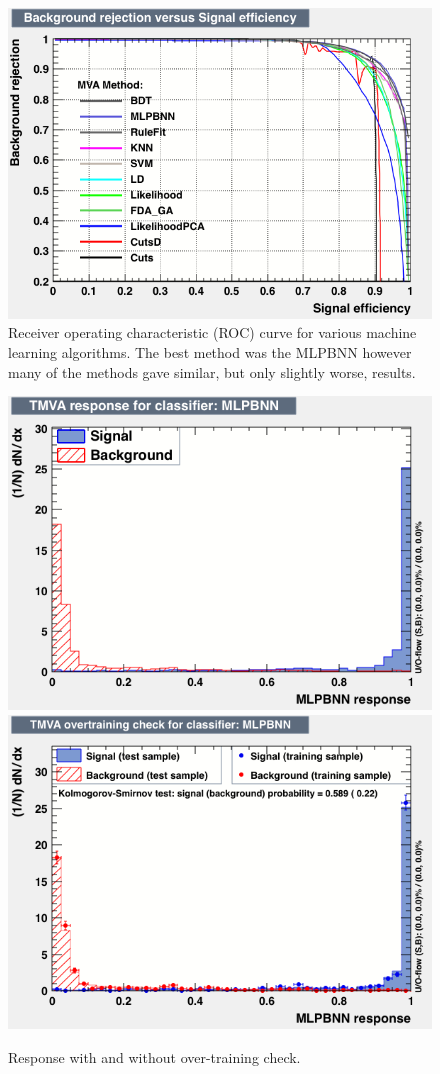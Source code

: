 \begin{figure}[h!]
\centering
\includegraphics[width=\textwidth]{figures/newTMVAplots/rejBvsS.png}
\caption{Receiver operating characteristic (ROC) curve for various machine learning algorithms. The best method was the MLPBNN however many of the methods gave similar, but only slightly worse, results.}
\label{fig:TMVANeuroc}
\end{figure}

\begin{figure}[h!]
\centering
\includegraphics[width=.49\textwidth]{figures/newTMVAplots/mva_MLPBNN.png}
\includegraphics[width=.49\textwidth]{figures/newTMVAplots/overtrain_MLPBNN.png}
\caption{Response with and without over-training check.}
\label{fig:TMVANeuresponce}
\end{figure}

